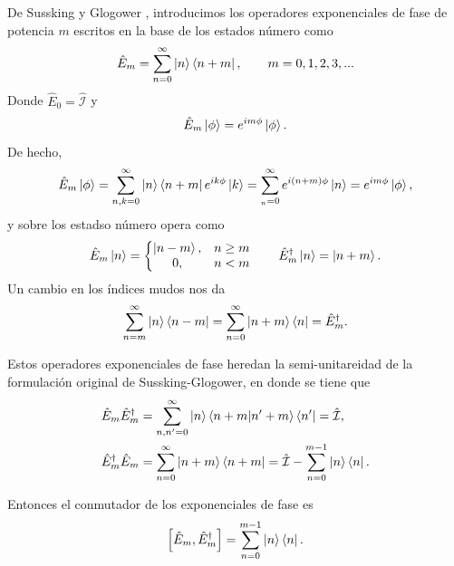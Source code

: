             De Sussking y Glogower \cite{susskind1964quantum}, introducimos los operadores exponenciales de fase de potencia $m$ escritos en la base de los estados número como
            \begin{equation}
                \hat{E}_m = \sum_{n=0}^{\infty}\ket{n}\bra{n+m}, \qquad m=0,1,2,3,...
            \end{equation}
            Donde $\hat{E}_0 = \hat{\mathcal{I}}$ y 
            \begin{equation}
                \hat{E}_m \ket{\phi} = e^{im\phi}\ket{\phi}.
            \end{equation}
            De hecho,
            \begin{equation*}
                \hat{E}_m \ket{\phi} = \sum_{n,k=0}^{\infty} \ket{n}\bra{n+m}e^{ik\phi}\ket{k} = \sum_{_n=0}^{\infty}e^{i(n+m)\phi}\ket{n} = e^{im\phi}\ket{\phi},
            \end{equation*}
            y sobre los estadso número opera como
            \begin{equation}
                \hat{E}_m \ket{n} = 
                \left\{
                \begin{matrix}
                    \ket{n-m}, & n \geq m\\
                    0, & n < m
                \end{matrix}
                \right.
                \qquad \hat{E}_m^\dagger \ket{n} = \ket{n+m}.
            \end{equation}
            Un cambio en los índices mudos nos da
            \begin{equation*}
                \sum_{n=m}^{\infty} \ket{n}\bra{n-m} = \sum_{n=0}^{\infty}\ket{n+m}\bra{n} = \hat{E}^\dagger_m.
            \end{equation*}

            Estos operadores exponenciales de fase heredan la semi-unitareidad de la formulación original de Sussking-Glogower, en donde se tiene que
            \begin{align}
                & \hat{E}_m \hat{E}_m^\dagger = \sum_{n,n'=0}^{\infty} \ket{n}\braket{n+m|n'+m} \bra{n'} = \hat{\mathcal{I}},\\
                & \hat{E}_m^\dagger\hat{E}_m = \sum_{n=0}^{\infty} \ket{n+m}\bra{n+m} = \hat{\mathcal{I}}- \sum_{n=0}^{m-1}\ket{n}\bra{n}.
            \end{align}

            Entonces el conmutador de los exponenciales de fase es
            \begin{equation*}
                \left[\hat{E}_m, \hat{E}_m^\dagger\right] = \sum_{n=0}^{m-1}\ket{n}\bra{n}.
            \end{equation*}

